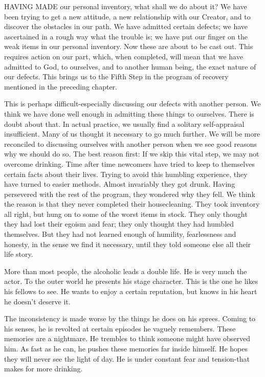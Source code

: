 
\bbChapterPreamble


\begin{biblechapter}

HAVING MADE our personal inventory, what shall we do about it?  We have been trying to get a new attitude, a new relationship with our Creator, and to discover the obstacles in our path.  We have admitted certain defects; we have ascertained in a rough way what the trouble is; we have put our finger on the weak items in our personal inventory.  Now these are about to be cast out.  This requires action on our part, which, when completed, will mean that we have admitted to God, to ourselves, and to another human being, the exact nature of our defects.  This brings us to the Fifth Step in the program of recovery mentioned in the preceding chapter.

This is perhaps difficult-especially discussing our defects with another person.  We think we have done well enough in admitting these things to ourselves.  There is doubt about that.  In actual practice, we usually find a solitary self-appraisal insufficient.  Many of us thought it necessary to go much further.  We will be more reconciled to discussing ourselves with another person when we see good reasons why we should do so.  The best reason first: If we skip this vital step, we may not overcome drinking.  Time after time newcomers have tried to keep to themselves certain facts about their lives.  Trying to avoid this humbling experience, they have turned to easier methods.  Almost invariably they got drunk.  Having persevered with the rest of the program, they wondered why they fell.  We think the reason is that they never completed their housecleaning.  They took inventory all right, but hung on to some of the worst items in stock.  They only thought they had lost their egoism and fear; they only thought they had humbled themselves.  But they had not learned enough of humility, fearlessness and honesty, in the sense we find it necessary, until they told someone else all their life story.

More than most people, the alcoholic leads a double life.  He is very much the actor.  To the outer world he presents his stage character.  This is the one he likes his fellows to see.  He wants to enjoy a certain reputation, but knows in his heart he doesn't deserve it.

The inconsistency is made worse by the things he does on his sprees.  Coming to his senses, he is revolted at certain episodes he vaguely remembers.  These memories are a nightmare.  He trembles to think someone might have observed him.  As fast as he can, he pushes these memories far inside himself.  He hopes they will never see the light of day.  He is under constant fear and tension-that makes for more drinking.


\end{biblechapter}
